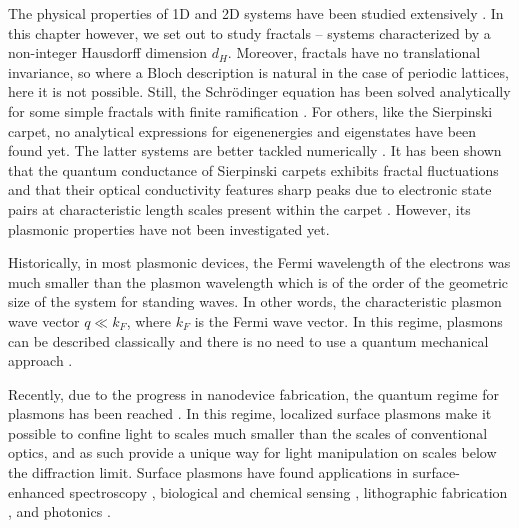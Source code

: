 The physical properties of 1D and 2D systems have been studied extensively \cite{lieb1966mathematical, giuliani2005quantum}. In this chapter however, we set out to study fractals -- systems characterized by a non-integer Hausdorff dimension $d_H$. Moreover, fractals have no translational invariance, so where a Bloch description is natural in the case of periodic lattices, here it is not possible. Still, the Schr\"odinger equation has been solved analytically for some simple fractals with finite ramification \cite{kadanoff1983}. For others, like the Sierpinski carpet, no analytical expressions for eigenenergies and eigenstates have been found yet.  The latter systems are better tackled numerically \cite{percolation1996}. It has been shown that the quantum conductance of Sierpinski carpets exhibits fractal fluctuations \cite{transport2016} and that their optical conductivity features sharp peaks due to electronic state pairs at characteristic length scales present within the carpet \cite{optics2017}. However, its plasmonic properties have not been investigated yet.

Historically, in most plasmonic devices, the Fermi wavelength of the electrons was much smaller than the plasmon wavelength which is of the order of the geometric size of the system for standing waves. In other words, the characteristic plasmon wave vector $q \ll k_F$, where $k_F$ is the Fermi wave vector. In this regime, plasmons can be described classically and there is no need to use a quantum mechanical approach \cite{nozieres1999theory, platzman1973waves,Vonsov2012QuantumSolidS, giuliani2005quantum}.

Recently, due to the progress in nanodevice fabrication, the quantum regime for plasmons has been reached \cite{scholl2012quantum, tame2013quantum}. In this regime, localized surface plasmons make it possible to confine light to scales much smaller than the scales of conventional optics, and as such provide a unique way for light manipulation on scales below the diffraction limit. Surface plasmons have found applications in surface-enhanced spectroscopy \cite{raman2005, second-harmonic1994}, biological and chemical sensing \cite{towards2005}, lithographic fabrication \cite{nanolithography2004}, and photonics \cite{brongersma2007surface}.

